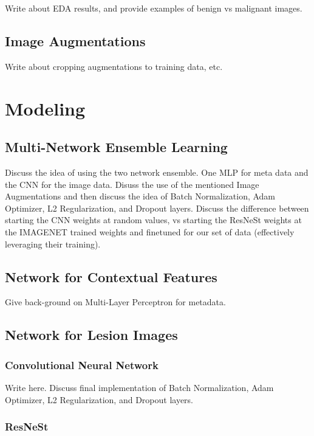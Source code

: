\documentclass [MAS] {uclathes}
\begin{document}
Write about EDA results, and provide examples of benign vs malignant images.

\section{Image Augmentations}

Write about cropping augmentations to training data, etc.


\chapter{Modeling}

\section{Multi-Network Ensemble Learning}

Discuss the idea of using the two network ensemble. One MLP for meta data and the CNN for the image data. Disuss the use of the mentioned Image Augmentations and then discuss the idea of Batch Normalization, Adam Optimizer, L2 Regularization, and Dropout layers. Discuss the difference between starting the CNN weights at random values, vs starting the ResNeSt weights at the IMAGENET trained weights and finetuned for our set of data (effectively leveraging their training).

\section{Network for Contextual Features}

Give back-ground on Multi-Layer Perceptron for metadata.

\section{Network for Lesion Images}

\subsection{Convolutional Neural Network}

Write here. Discuss final implementation of Batch Normalization, Adam Optimizer, L2 Regularization, and Dropout layers.

\subsection{ResNeSt}
\end{document}
